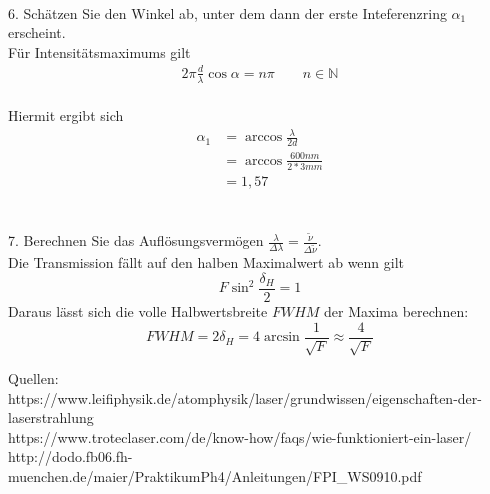 \documentclass{article}
\begin{document}
\\6. Schätzen Sie den Winkel ab, unter dem dann der erste Inteferenzring ${\alpha}_1$ erscheint.
\\Für Intensitätsmaximums gilt
\begin{align*}
2\pi \frac{d}{\lambda}\cos\alpha=n\pi \qquad n\in \mathbb{N}
\end{align*}
\\Hiermit ergibt sich
\begin{align*}
{\alpha}_1 &=\arccos \frac{\lambda}{2d}
\\ &=\arccos \frac{600nm}{2*3mm}
\\ &=1,57
\end{align*}\\
\\
7. Berechnen Sie das Auflösungsvermögen $\frac{\lambda}{\Delta\lambda}=\frac{\tilde{\nu}}{\Delta\tilde{\nu}}$.\\
Die Transmission fällt auf den halben Maximalwert ab wenn gilt
\[
F\sin^2\frac{{\delta}_H}{2}=1
\]
Daraus lässt sich die volle Halbwertsbreite $FWHM$ der Maxima berechnen:
\[
FWHM=2{\delta}_H=4\arcsin\frac{1}{\sqrt{F}}\approx \frac{4}{\sqrt{F}}
\]




\newpage
Quellen:\\
https://www.leifiphysik.de/atomphysik/laser/grundwissen/eigenschaften-der-laserstrahlung\\
https://www.troteclaser.com/de/know-how/faqs/wie-funktioniert-ein-laser/\\
http://dodo.fb06.fh-muenchen.de/maier/PraktikumPh4/Anleitungen/FPI_WS0910.pdf
\end{document}
